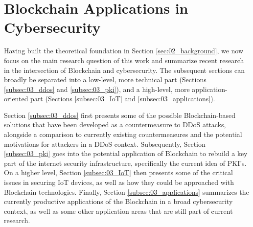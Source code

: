 \section{Blockchain Applications in Cybersecurity}
\label{sec:03_related_work}

Having built the theoretical foundation in Section \ref{sec:02_background}, we now focus on the main research question of this work and summarize recent research in the intersection of Blockchain and cybersecurity. The subsequent sections can broadly be separated into a low-level, more technical part (Sections \ref{subsec:03_ddos} and \ref{subsec:03_pki}), and a high-level, more application-oriented part (Sections \ref{subsec:03_IoT} and \ref{subsec:03_applications}).

Section \ref{subsec:03_ddos} first presents some of the possible Blockchain-based solutions that have been developed as a countermeasure to DDoS attacks, alongside a comparison to currently existing countermeasures and the potential motivations for attackers in a DDoS context. Subsequently, Section \ref{subsec:03_pki} goes into the potential application of Blockchain to rebuild a key part of the internet security infrastructure, specifically the current idea of PKI's. On a higher level, Section \ref{subsec:03_IoT} then presents some of the critical issues in securing IoT devices, as well as how they could be approached with Blockchain technologies. Finally, Section \ref{subsec:03_applications} summarizes the currently productive applications of the Blockchain in a broad cybersecurity context, as well as some other application areas that are still part of current research.





